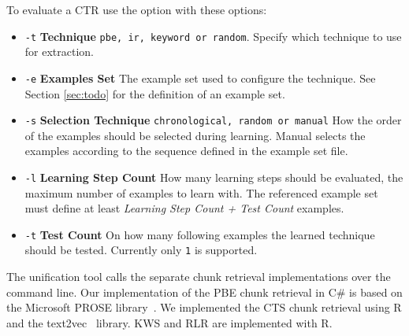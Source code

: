 \documentclass[\myrootdir/main.tex]{subfiles}
\begin{document}
To evaluate a CTR use the option  with these options:
\begin{itemize}
    \item \texttt{-t} \textbf{Technique} \texttt{pbe, ir, keyword or random}. Specify which technique to use for extraction.
    \item \texttt{-e} \textbf{Examples Set} The example set used to configure the technique. See Section \ref{sec:todo} for the definition of an example set.
    \item \texttt{-s} \textbf{Selection Technique} \texttt{chronological, random or manual} How the order of the examples should be selected during learning.
    Manual selects the examples according to the sequence defined in the example set file.
    \item \texttt{-l} \textbf{Learning Step Count} How many learning steps should be evaluated, the maximum number of examples to learn with.
    The referenced example set must define at least \emph{Learning Step Count + Test Count} examples.
    \item \texttt{-t} \textbf{Test Count} On how many following examples the learned technique should be tested.
    Currently only \texttt{1} is supported.
\end{itemize}

The unification tool calls the separate chunk retrieval implementations over the command line.
Our implementation of the PBE chunk retrieval in C\# is based on the Microsoft PROSE library~\cite{prose2019webpage}.
We implemented the CTS chunk retrieval using R and the text2vec~\cite{text2vec2019webpage} library.
KWS and RLR are implemented with R.




\end{document}
